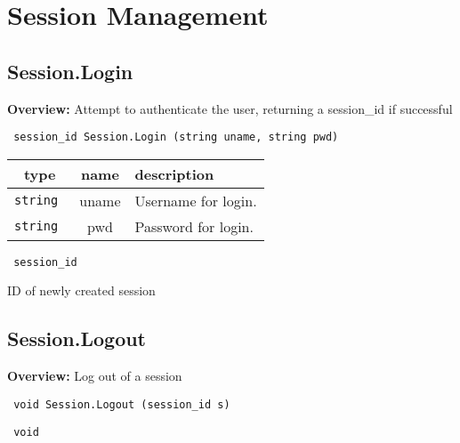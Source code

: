 \newpage\section{Session Management}

\subsection{Session.Login}

{\bf Overview:} 
Attempt to authenticate the user, returning a session\_id if successful

\begin{verbatim} session_id Session.Login (string uname, string pwd)\end{verbatim}



 
\vspace{0.3cm}
\begin{tabular}{|c|c|p{7cm}|}
 \hline
{\bf type} & {\bf name} & {\bf description} \\ \hline
{\tt string } & uname & Username for login. \\ \hline 

{\tt string } & pwd & Password for login. \\ \hline 

\end{tabular}

\vspace{0.3cm}

{\tt 
session\_id
}


ID of newly created session
\vspace{0.3cm}
\vspace{0.3cm}
\vspace{0.3cm}

\subsection{Session.Logout}

{\bf Overview:} 
Log out of a session

\begin{verbatim} void Session.Logout (session_id s)\end{verbatim}


\vspace{0.3cm}

{\tt 
void
}



